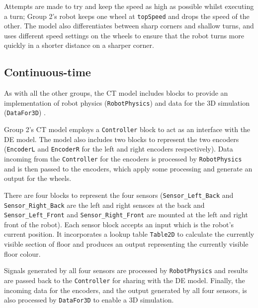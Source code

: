 Attempts are made to try and keep the speed as high as possible whilst
executing a turn; Group 2's robot keeps one wheel at \texttt{topSpeed}
and drops the speed of the other.  The model also differentiates
between sharp corners and shallow turns, and uses different speed
settings on the wheels to ensure that the robot turns more quickly in
a shorter distance on a sharper corner.

\subsection{Continuous-time}
As with all the other groups, the CT model includes blocks to provide
an implementation of robot physics (\texttt{RobotPhysics}) and data
for the 3D simulation (\texttt{DataFor3D}) .

Group 2's CT model employs a \texttt{Controller} block to act as an
interface with the DE model.  The model also includes two blocks to
represent the two encoders (\texttt{EncoderL} and \texttt{EncoderR}
for the left and right encoders respectively).  Data incoming from the
\texttt{Controller} for the encoders is processed by
\texttt{RobotPhysics} and is then passed to the encoders, which apply
some processing and generate an output for the wheels.

There are four blocks to represent the four sensors
(\texttt{Sensor\_Left\_Back} and \texttt{Sensor\-\_\-Right\-\_\-Back} are the left and
right sensors at the back and \texttt{Sensor\_Left\_Front} and
\texttt{Sensor\_Right\_Front} are mounted at the left and right front of the
robot).  Each sensor block accepts an input which is the robot's
current position.  It incorporates a lookup table \texttt{Table2D} to
calculate the currently visible section of floor and produces an
output representing the currently visible floor colour.

Signals generated by all four sensors are processed by
\texttt{RobotPhysics} and results are passed back to the
\texttt{Controller} for sharing with the DE model.  Finally, the
incoming data for the encoders, and the output generated by all four
sensors, is also processed by \texttt{DataFor3D} to enable a 3D
simulation.








